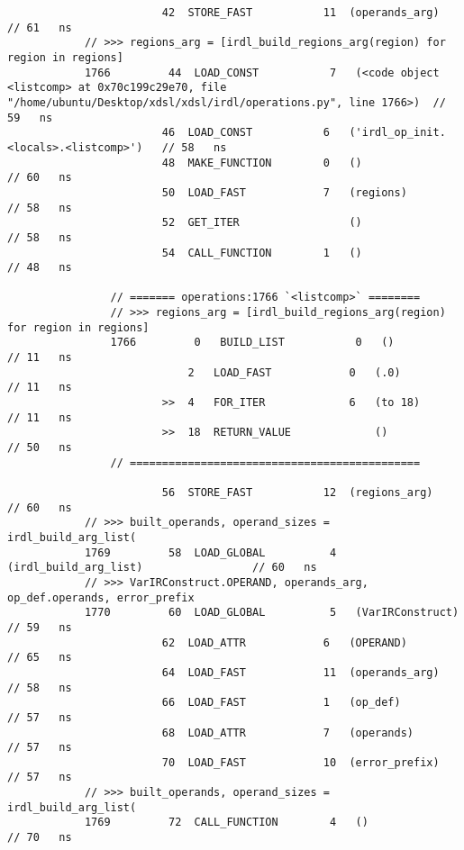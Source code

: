 \begin{code}
\begin{verbatim}
                        42  STORE_FAST           11  (operands_arg)                         // 61   ns
            // >>> regions_arg = [irdl_build_regions_arg(region) for region in regions]
            1766         44  LOAD_CONST           7   (<code object <listcomp> at 0x70c199c29e70, file "/home/ubuntu/Desktop/xdsl/xdsl/irdl/operations.py", line 1766>)  // 59   ns
                        46  LOAD_CONST           6   ('irdl_op_init.<locals>.<listcomp>')   // 58   ns
                        48  MAKE_FUNCTION        0   ()                                     // 60   ns
                        50  LOAD_FAST            7   (regions)                              // 58   ns
                        52  GET_ITER                 ()                                     // 58   ns
                        54  CALL_FUNCTION        1   ()                                     // 48   ns

                // ======= operations:1766 `<listcomp>` ========
                // >>> regions_arg = [irdl_build_regions_arg(region) for region in regions]
                1766         0   BUILD_LIST           0   ()                                // 11   ns
                            2   LOAD_FAST            0   (.0)                               // 11   ns
                        >>  4   FOR_ITER             6   (to 18)                            // 11   ns
                        >>  18  RETURN_VALUE             ()                                 // 50   ns
                // =============================================

                        56  STORE_FAST           12  (regions_arg)                          // 60   ns
            // >>> built_operands, operand_sizes = irdl_build_arg_list(
            1769         58  LOAD_GLOBAL          4   (irdl_build_arg_list)                 // 60   ns
            // >>> VarIRConstruct.OPERAND, operands_arg, op_def.operands, error_prefix
            1770         60  LOAD_GLOBAL          5   (VarIRConstruct)                      // 59   ns
                        62  LOAD_ATTR            6   (OPERAND)                              // 65   ns
                        64  LOAD_FAST            11  (operands_arg)                         // 58   ns
                        66  LOAD_FAST            1   (op_def)                               // 57   ns
                        68  LOAD_ATTR            7   (operands)                             // 57   ns
                        70  LOAD_FAST            10  (error_prefix)                         // 57   ns
            // >>> built_operands, operand_sizes = irdl_build_arg_list(
            1769         72  CALL_FUNCTION        4   ()                                    // 70   ns


\end{verbatim}
\end{code}
